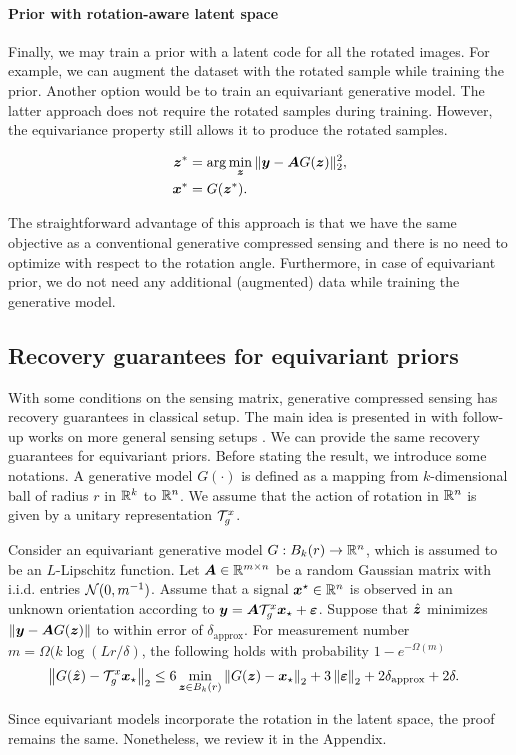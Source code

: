 \paragraph{Prior with rotation-aware latent space}
Finally, we may train a prior with a latent code for all the rotated images. For example, we can augment the dataset with the rotated sample while training the prior. Another option would be to train an equivariant generative model. The latter approach does not require the rotated samples during training. However, the equivariance property still allows it to produce the rotated samples. 

\begin{align}
    {\bm{z}}^* &= \arg\min_{{\bm{z}}} \|{\bm{y}} - {\bm{A}} G({\bm{z}})\|_2^2,\\
    {\bm{x}}^{*} &= G({\bm{z}}^*).
\end{align}

The straightforward advantage of this approach is that we have the same objective as a conventional generative compressed sensing and there is no need to optimize with respect to the rotation angle. Furthermore, in case of equivariant prior, we do not need any additional (augmented) data while training the generative model.

\subsection{Recovery guarantees for equivariant priors}
With some conditions on the sensing matrix, generative  compressed sensing has recovery guarantees in classical setup. The main idea is presented in \cite{Bora2017-as} with follow-up works on more general sensing setups \cite{liu_generalized_2020, liu_sample_2020}. We can provide the same recovery guarantees for equivariant priors. Before stating the result, we introduce some notations. A generative model $G(\cdot)$ is defined as a mapping from $k$-dimensional ball of radius $r$ in $\mathbb{R}^k$ to $\mathbb{R}^n$. We assume that the action of rotation in $\mathbb{R}^n$ is given by a unitary representation ${{\mathcal{T}}_g^x}$.

\begin{theorem}
Consider an equivariant generative model $G: B_k(r)\to\mathbb{R}^n$, which is assumed to be an $L$-Lipschitz function. 
Let ${\bm{A}}\in\mathbb{R}^{m\times n}$ be a random Gaussian matrix with i.i.d. entries ${\mathcal{N}}(0,m^{-1})$. 
Assume that a signal ${\bm{x}}^\star\in\mathbb{R}^n$ is observed in an unknown orientation according to ${\bm{y}} = {\bm{A}} {\mathcal{T}}_g^x {\bm{x}}_\star + {\bm{\varepsilon}}$. 
Suppose that $\hat{{\bm{z}}}$ minimizes $\left\|{\bm{y}}-{\bm{A}} G({\bm{z}})\right\|$ to within error of $\delta_{\text{approx}}$.
For measurement  number $m =\Omega(k \log (Lr/\delta)$, the following holds with probability $1-e^{-\Omega(m)}$
\begin{align*}
&\left\|G(\hat{{\bm{z}}})-{\mathcal{T}}_g^x {\bm{x}}_\star\right\|_2  \leq  6 \min_{{\bm{z}}\in B_k(r)}\left\|G({\bm{z}})-{\bm{x}}_\star\right\|_2 + 3\left\|{\bm{\varepsilon}}\right\|_2 + 2\delta_{\text{approx}} + 2\delta.
\end{align*}
\label{thm:equivmodel}
\end{theorem}
Since equivariant models incorporate the rotation in the latent space, the proof remains the same. Nonetheless, we review it in the Appendix.


